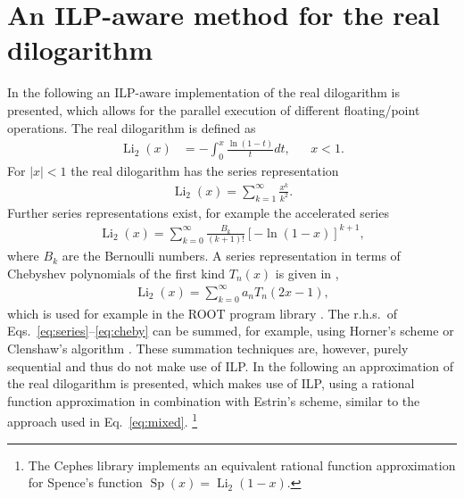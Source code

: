 \documentclass[10pt,DIV16,twocolumn,numbers=noenddot]{scrartcl}
\newcommand{\Li}{\operatorname{Li}_2}
\begin{document}
\section{An ILP-aware method for the real dilogarithm}
\label{sec:algorithm}

In the following an ILP-aware implementation of the real dilogarithm
is presented, which allows for the parallel execution of different
floating\-/point operations.  The real dilogarithm is defined as
%
\begin{align}
  \Li(x) &= -\int_0^x \frac{\ln(1-t)}{t}dt, &
  &x<1.
\end{align}
%
For $|x|<1$ the real dilogarithm has the series representation
%
\begin{align}
  \Li(x) = \sum_{k=1}^\infty \frac{x^k}{k^2}.
  \label{eq:series}
\end{align}
%
Further series representations exist, for example the accelerated
series
%
\begin{align}
  \Li(x) = \sum_{k=0}^\infty \frac{B_k}{(k+1)!} [-\ln(1-x)]^{k+1},
\end{align}
%
where $B_k$ are the Bernoulli numbers.  A series representation in
terms of Chebyshev polynomials of the first kind $T_n(x)$ is given in
\cite{luke},
%
\begin{align}
  \Li(x) = \sum_{k=0}^\infty a_n T_n(2x-1),
  \label{eq:cheby}
\end{align}
%
which is used for example in the ROOT program library \cite{root}.
The r.h.s.\ of Eqs.~\eqref{eq:series}--\eqref{eq:cheby} can be summed,
for example, using Horner's scheme or Clenshaw's algorithm
\cite{clenshaw}.  These summation techniques are, however, purely
sequential and thus do not make use of ILP.  In the following an
approximation of the real dilogarithm is presented, which makes use of
ILP, using a rational function approximation in combination with
Estrin's scheme, similar to the approach used in
Eq.~\eqref{eq:mixed}.%
\footnote{The Cephes library \cite{cephes} implements an equivalent
  rational function approximation for Spence's function
  $\operatorname{Sp}(x)=\Li(1-x)$.}
\end{document}
